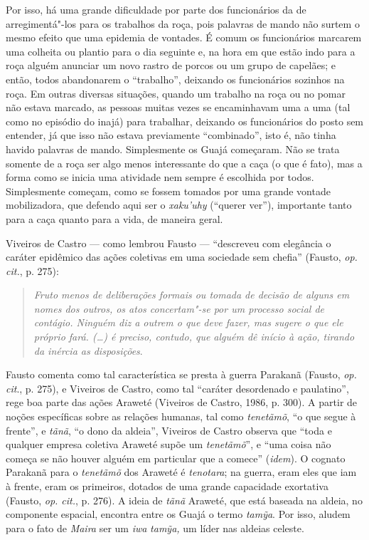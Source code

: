 Por isso, há uma grande dificuldade por parte dos funcionários da 
de arregimentá"-los para os trabalhos da roça, pois palavras de mando não
surtem o mesmo efeito que uma epidemia de vontades. É comum os
funcionários marcarem uma colheita ou plantio para o dia seguinte e, na
hora em que estão indo para a roça alguém anunciar um novo rastro de
porcos ou um grupo de capelães; e então, todos abandonarem o ``trabalho'',
deixando os funcionários sozinhos na roça. Em outras diversas situações,
quando um trabalho na roça ou no pomar não estava marcado, as pessoas
muitas vezes se encaminhavam uma a uma (tal como no episódio do inajá)
para trabalhar, deixando os funcionários do posto sem entender, já que
isso não estava previamente ``combinado'', isto é, não tinha havido
palavras de mando. Simplesmente os Guajá começaram. Não se trata somente
de a roça ser algo menos interessante do que a caça (o que é fato), mas
a forma como se inicia uma atividade nem sempre é escolhida por todos.
Simplesmente começam, como se fossem tomados por uma grande vontade
mobilizadora, que defendo aqui ser o \emph{xaku'uhy} (``querer ver''),
importante tanto para a caça quanto para a vida, de maneira geral.

Viveiros de Castro --- como lembrou Fausto --- ``descreveu com elegância o
caráter epidêmico das ações coletivas em uma sociedade sem chefia''
(Fausto, \emph{op. cit.}, p. 275):

\begin{quote}
\emph{Fruto menos de deliberações formais ou tomada de decisão de alguns em
nomes dos outros, os atos concertam"-se por um processo social de
contágio. Ninguém diz a outrem o que deve fazer, mas sugere o que ele
próprio fará. (\ldots{}) é preciso, contudo, que alguém dê início à ação,
tirando da inércia as disposições}.
\end{quote}

Fausto comenta como tal característica se presta à guerra Parakanã
(Fausto, \emph{op. cit}., p. 275), e Viveiros de Castro, como tal ``caráter
desordenado e paulatino'', rege boa parte das ações Araweté (Viveiros de
Castro, 1986, p. 300). A partir de noções específicas sobre as relações
humanas, tal como \emph{tenetãmõ}, ``o que segue à frente'', e
\emph{tãnã}, ``o dono da aldeia'', Viveiros de Castro observa que ``toda e
qualquer empresa coletiva Araweté supõe um \emph{tenetãmõ}'', e ``uma
coisa não começa se não houver alguém em particular que a comece''
(\emph{idem}). O cognato Parakanã para o \emph{tenetãmõ} dos Araweté é
\emph{tenotara}; na guerra, eram eles que iam à frente, eram os
primeiros, dotados de uma grande capacidade exortativa (Fausto, \emph{op.
cit.}, p. 276). A ideia de \emph{tãnã} Araweté, que está baseada na
aldeia, no componente espacial, encontra entre os Guajá o termo
\emph{tamỹa}. Por isso, aludem para o fato de \emph{Maira} ser um
\emph{iwa} \emph{tamỹa,} um líder nas aldeias celeste.

